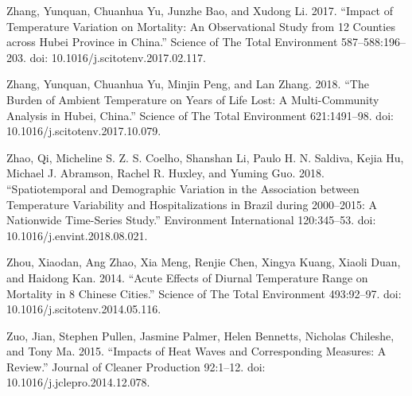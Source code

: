 \documentclass[12pt]{article}
\begin{document}
Zhang, Yunquan, Chuanhua Yu, Junzhe Bao, and Xudong Li. 2017. ``Impact
of Temperature Variation on Mortality: An Observational Study from 12
Counties across Hubei Province in China.'' Science of The Total
Environment 587--588:196--203. doi: 10.1016/j.scitotenv.2017.02.117.

Zhang, Yunquan, Chuanhua Yu, Minjin Peng, and Lan Zhang. 2018. ``The
Burden of Ambient Temperature on Years of Life Lost: A Multi-Community
Analysis in Hubei, China.'' Science of The Total Environment
621:1491--98. doi: 10.1016/j.scitotenv.2017.10.079.

Zhao, Qi, Micheline S. Z. S. Coelho, Shanshan Li, Paulo H. N. Saldiva,
Kejia Hu, Michael J. Abramson, Rachel R. Huxley, and Yuming Guo. 2018.
``Spatiotemporal and Demographic Variation in the Association between
Temperature Variability and Hospitalizations in Brazil during
2000--2015: A Nationwide Time-Series Study.'' Environment International
120:345--53. doi: 10.1016/j.envint.2018.08.021.

Zhou, Xiaodan, Ang Zhao, Xia Meng, Renjie Chen, Xingya Kuang, Xiaoli
Duan, and Haidong Kan. 2014. ``Acute Effects of Diurnal Temperature
Range on Mortality in 8 Chinese Cities.'' Science of The Total
Environment 493:92--97. doi: 10.1016/j.scitotenv.2014.05.116.

Zuo, Jian, Stephen Pullen, Jasmine Palmer, Helen Bennetts, Nicholas
Chileshe, and Tony Ma. 2015. ``Impacts of Heat Waves and Corresponding
Measures: A Review.'' Journal of Cleaner Production 92:1--12. doi:
10.1016/j.jclepro.2014.12.078.



\end{document}
